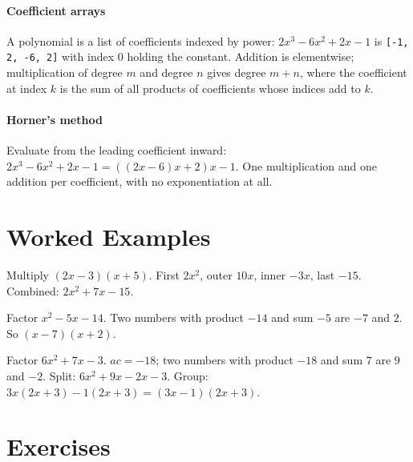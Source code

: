 \paragraph{Coefficient arrays} A polynomial is a list of coefficients indexed by power: $2x^3 - 6x^2 + 2x - 1$ is \lstinline![-1, 2, -6, 2]! with index 0 holding the constant. Addition is elementwise; multiplication of degree $m$ and degree $n$ gives degree $m + n$, where the coefficient at index $k$ is the sum of all products of coefficients whose indices add to $k$.

\paragraph{Horner's method} Evaluate from the leading coefficient inward: $2x^3 - 6x^2 + 2x - 1 = ((2x - 6)x + 2)x - 1$. One multiplication and one addition per coefficient, with no exponentiation at all.

\section{Worked Examples}

\begin{example}
Multiply $(2x - 3)(x + 5)$.
\solution First $2x^2$, outer $10x$, inner $-3x$, last $-15$. Combined: $2x^2 + 7x - 15$.
\end{example}

\begin{example}
Factor $x^2 - 5x - 14$.
\solution Two numbers with product $-14$ and sum $-5$ are $-7$ and $2$. So $(x - 7)(x + 2)$.
\end{example}

\begin{example}
Factor $6x^2 + 7x - 3$.
\solution $ac = -18$; two numbers with product $-18$ and sum $7$ are $9$ and $-2$. Split: $6x^2 + 9x - 2x - 3$. Group: $3x(2x + 3) - 1(2x + 3) = (3x - 1)(2x + 3)$.
\end{example}

\section{Exercises}

